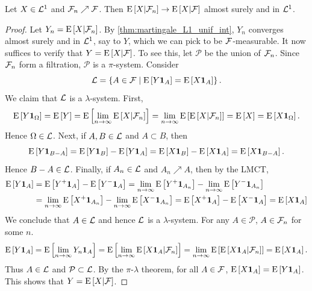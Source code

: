 \begin{theorem}
    Let $X\in\L^1$ and $\F_n\nearrow\F$. Then $\E\sbrc{X|\F_n}\to\E\sbrc{X|\F}$ almost 
    surely and in $\L^1$. 
\end{theorem}
\begin{proof}
    Let $Y_n = \E\sbrc{X|\F_n}$. By \cref{thm:martingale_L1_unif_int}, $Y_n$ converges 
    almost surely and in $\L^1$, say to $Y$, which we can pick to be $\F$-measurable. It 
    now suffices to verify that $Y = \E\sbrc{X|\F}$. To see this, let $\mathcal{P}$ be the 
    union of $\F_n$. Since $\F_n$ form a filtration, $\mathcal{P}$ is a $\pi$-system. 
    Consider 
    \begin{equation*}
        \L = \Set{A\in\F}{\E\sbrc{Y\one_A} = \E\sbrc{X\one_A}}.
    \end{equation*}
    We claim that $\L$ is a $\lambda$-system. First, 
    \begin{equation*}
        \E\sbrc{Y\one_\Omega} = \E\sbrc{Y} = \E\sbrc{\lim_{n\to\infty}\E\sbrc{X|\F_n}} 
        = \lim_{n\to\infty}\E\sbrc{\E\sbrc{X|\F_n}} = \E\sbrc{X} = \E\sbrc{X\one_{\Omega}}.
    \end{equation*}
    Hence $\Omega\in\L$. Next, if $A,B\in\L$ and $A\subset B$, then 
    \begin{equation*}
        \E\sbrc{Y\one_{B-A}} = \E\sbrc{Y\one_{B}} - \E\sbrc{Y\one_{A}} 
        = \E\sbrc{X\one_B} - \E\sbrc{X\one_A}  = \E\sbrc{X\one_{B-A}}. 
    \end{equation*}
    Hence $B-A\in\L$. Finally, if $A_n\in\L$ and $A_n\nearrow A$, then by the LMCT, 
    \begin{equation*}
        \begin{split}
            \E\sbrc{Y\one_A} &= \E\sbrc{Y^+\one_A} - \E\sbrc{Y^-\one_A} 
            = \lim_{n\to\infty}\E\sbrc{Y^+\one_{A_n}} - \lim_{n\to\infty}\E\sbrc{Y^-\one_{A_n}} \\
            &= \lim_{n\to\infty}\E\sbrc{X^+\one_{A_n}} - \lim_{n\to\infty}\E\sbrc{X^-\one_{A_n}}  
            = \E\sbrc{X^+\one_A} - \E\sbrc{X^-\one_A}  = \E\sbrc{X\one_A}
        \end{split}
    \end{equation*}
    We conclude that $A\in\L$ and hence $\L$ is a $\lambda$-system. For any $A\in\mathcal{P}$, 
    $A\in\F_n$ for some $n$. 
    \begin{equation*}
        \E\sbrc{Y\one_A} = \E\sbrc{\lim_{n\to\infty}Y_n\one_A}
        = \E\sbrc{\lim_{n\to\infty}\E\sbrc{X\one_A|\F_n}} = \lim_{n\to\infty}\E\sbrc{\E\sbrc{X\one_A|\F_n}}
        = \E\sbrc{X\one_A}.
    \end{equation*} 
    Thus $A\in\L$ and $\mathcal{P}\subset\L$. By the $\pi$-$\lambda$ theorem, for all $A\in\F$, 
    $\E\sbrc{X\one_A} = \E\sbrc{Y\one_A}$. This shows that $Y = \E\sbrc{X|\F}$.
\end{proof}

